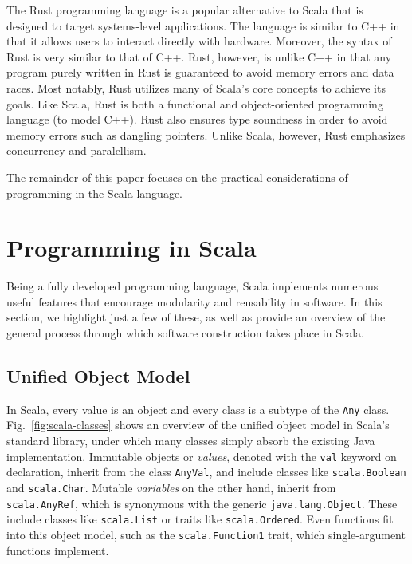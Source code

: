 \documentclass[jou,apacite]{IEEEtran}
\begin{document}
The Rust programming language is a popular alternative to Scala that is
designed to target systems-level applications. The 
language is similar to C++ in that it allows users to interact directly 
with hardware. Moreover, the syntax of Rust is very similar to that of C++. 
Rust, however, is unlike C++ in that any program purely written
in Rust is guaranteed to avoid memory errors and data races.
Most notably, Rust utilizes many of Scala's core concepts to achieve its goals.
Like Scala, Rust is both a functional and object-oriented programming language
(to model C++). Rust also ensures type soundness in order to avoid memory errors
such as dangling pointers. Unlike Scala, however, Rust emphasizes 
concurrency and paralellism.

The remainder of this paper focuses on the practical considerations of
programming in the Scala language.

\section{Programming in Scala}
\label{sec:programming-scala}

Being a fully developed programming language, Scala implements numerous useful
features that encourage modularity and reusability in software. In this section,
we highlight just a few of these, as well as provide an overview of the general
process through which software construction takes place in Scala.

\subsection{Unified Object Model}
\label{sec:unified-object-model}

In Scala, every value is an object and every class is a subtype of the
\texttt{Any} class. Fig.~\ref{fig:scala-classes} shows an overview of the
unified object model in Scala's standard library, under which many classes
simply absorb the existing Java implementation. Immutable objects or
\emph{values}, denoted with the \texttt{val} keyword on declaration, inherit
from the class \texttt{AnyVal}, and include classes like \texttt{scala.Boolean}
and \texttt{scala.Char}. Mutable \emph{variables} on the other hand, inherit
from \texttt{scala.AnyRef}, which is synonymous with the generic
\texttt{java.lang.Object}. These include classes like \texttt{scala.List} or
traits like \texttt{scala.Ordered}. Even functions fit into this object model,
such as the \texttt{scala.Function1} trait, which single-argument functions
implement.
\end{document}
